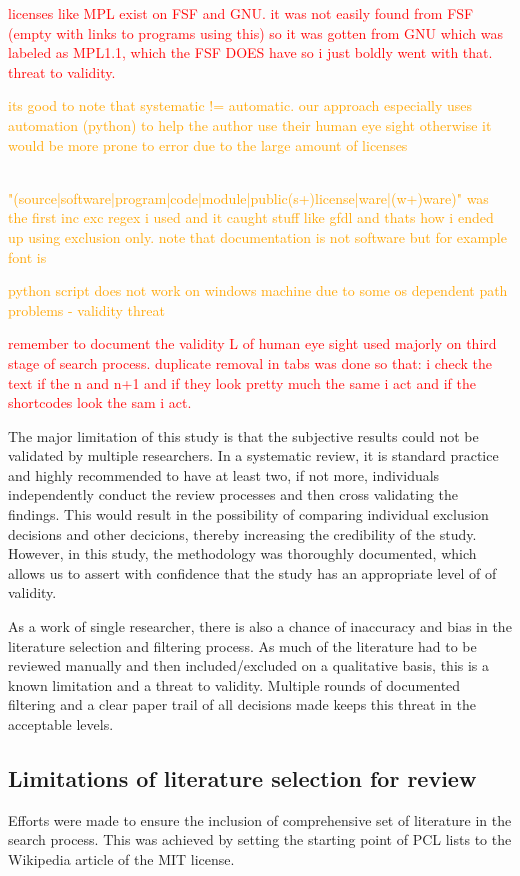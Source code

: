 \textcolor{red}{licenses like MPL exist on FSF and GNU. it was not easily found from FSF (empty with links to programs using this) so it was gotten from GNU which was labeled as MPL1.1, which the FSF DOES have so i just boldly went with that. threat to validity.}

\textcolor{orange}{its good to note that systematic != automatic. our approach especially uses automation (python) to help the author use their human eye sight otherwise it would be more prone to error due to the large amount of licenses}

\textcolor{orange}{\\"(source|software|program|code|module|public(s+)license|ware|(w+)ware)" was the first inc exc regex i used and it caught stuff like gfdl and thats how i ended up using exclusion only. note that documentation is not software but for example font is}

\textcolor{orange}{python script does not work on windows machine due to some os dependent path problems - validity threat}

\textcolor{red}{remember to document the validity L of human eye sight used majorly on third stage of search process. duplicate removal in tabs was done so that: i check the text if the n and n+1 and if they look pretty much the same i act and if the shortcodes look the sam i act.}

The major limitation of this study is that the subjective results could not be validated by multiple researchers. In a systematic review, it is standard practice and highly recommended to have at least two, if not more, individuals independently conduct the review processes and then cross validating the findings. This would result in the possibility of comparing individual exclusion decisions and other decicions, thereby increasing the credibility of the study. However, in this study, the methodology was thoroughly documented, which allows us to assert with confidence that the study has an appropriate level of of validity.

As a work of single researcher, there is also a chance of inaccuracy and bias in the literature selection and filtering process. As much of the literature had to be reviewed manually and then included/excluded on a qualitative basis, this is a known limitation and a threat to validity. Multiple rounds of documented filtering and a clear paper trail of all decisions made keeps this threat in the acceptable levels.

\subsection{Limitations of literature selection for review}
Efforts were made to ensure the inclusion of comprehensive set of literature in the search process. This was achieved by setting the starting point of PCL lists to the Wikipedia article of the MIT license.

